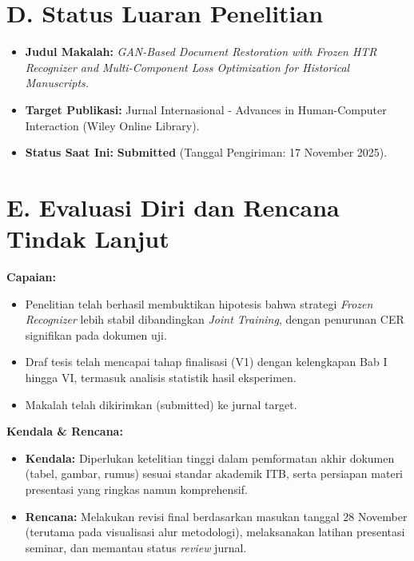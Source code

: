 \documentclass[a4paper,11pt]{article}
\begin{document}
\section*{D. Status Luaran Penelitian}
\begin{itemize}
    \item \textbf{Judul Makalah:} \textit{GAN-Based Document Restoration with Frozen HTR Recognizer and Multi-Component Loss Optimization for Historical Manuscripts.}
    \item \textbf{Target Publikasi:} Jurnal Internasional - Advances in Human-Computer Interaction (Wiley Online Library).
    \item \textbf{Status Saat Ini:} \textbf{Submitted} (Tanggal Pengiriman: 17 November 2025).
\end{itemize}

\section*{E. Evaluasi Diri dan Rencana Tindak Lanjut}
\textbf{Capaian:}
\begin{itemize}
    \item Penelitian telah berhasil membuktikan hipotesis bahwa strategi \textit{Frozen Recognizer} lebih stabil dibandingkan \textit{Joint Training}, dengan penurunan CER signifikan pada dokumen uji.
    \item Draf tesis telah mencapai tahap finalisasi (V1) dengan kelengkapan Bab I hingga VI, termasuk analisis statistik hasil eksperimen.
    \item Makalah telah dikirimkan (submitted) ke jurnal target.
\end{itemize}

\textbf{Kendala \& Rencana:}
\begin{itemize}
    \item \textbf{Kendala:} Diperlukan ketelitian tinggi dalam pemformatan akhir dokumen (tabel, gambar, rumus) sesuai standar akademik ITB, serta persiapan materi presentasi yang ringkas namun komprehensif.
    \item \textbf{Rencana:} Melakukan revisi final berdasarkan masukan tanggal 28 November (terutama pada visualisasi alur metodologi), melaksanakan latihan presentasi seminar, dan memantau status \textit{review} jurnal.
\end{itemize}

\end{document}
